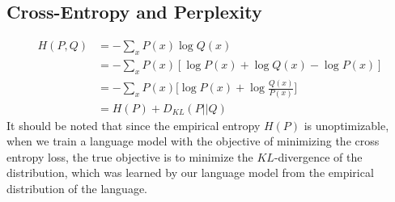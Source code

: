 \subsection{Cross-Entropy and Perplexity}
\begin{align*}
	H(P,Q) &= -\sum_{x}P(x)\log Q(x) \\
	&= -\sum_{x}P(x) [\log P(x) + \log Q(x) - \log P(x)] \\
	&= -\sum_{x}P(x)\Bigg[\log P(x) + \log\frac{Q(x)}{P(x)}\Bigg] \\
	&= H(P) + D_{KL}(P||Q)
\end{align*}
It should be noted that since the empirical entropy $H(P)$ is unoptimizable, when we train a language model with the objective of minimizing the cross entropy loss, the true objective is to minimize the $KL$-divergence of the distribution, which was learned by our language model from the empirical distribution of the language.
